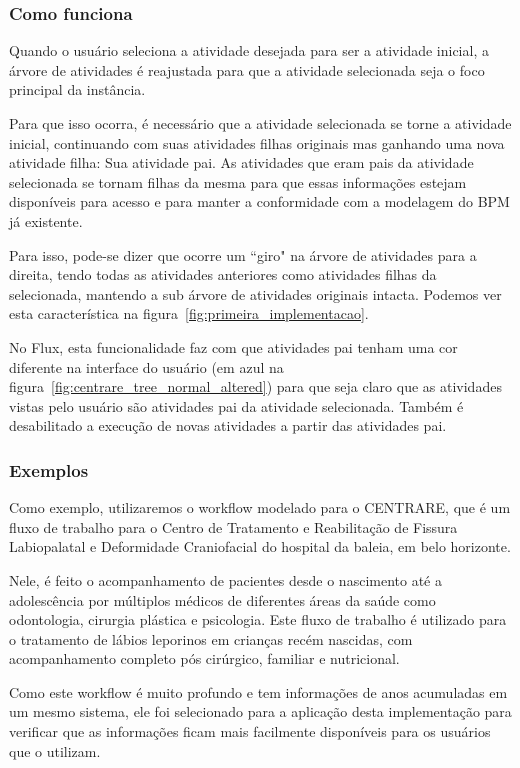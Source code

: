 \subsubsection{Como funciona}

Quando o usuário seleciona a atividade desejada para ser a atividade inicial, a árvore de atividades é reajustada para que a atividade selecionada seja o foco principal da instância.

Para que isso ocorra, é necessário que a atividade selecionada se torne a atividade inicial, continuando com suas atividades filhas originais mas ganhando uma nova atividade filha: Sua atividade pai. As atividades que eram pais da atividade selecionada se tornam filhas da mesma para que essas informações estejam disponíveis para acesso e para manter a conformidade com a modelagem do BPM já existente.

Para isso, pode-se dizer que ocorre um ``giro" na árvore de atividades para a direita, tendo todas as atividades anteriores como atividades filhas da selecionada, mantendo a sub árvore de atividades originais intacta. Podemos ver esta característica na figura~\ref{fig:primeira_implementacao}.

No Flux, esta funcionalidade faz com que atividades pai tenham uma cor diferente na interface do usuário (em azul na figura~\ref{fig:centrare_tree_normal_altered}) para que seja claro que as atividades vistas pelo usuário são atividades pai da atividade selecionada. Também é desabilitado a execução de novas atividades a partir das atividades pai.

\subsubsection{Exemplos}

Como exemplo, utilizaremos o workflow modelado para o CENTRARE, que é um fluxo de trabalho para o Centro de Tratamento e Reabilitação de Fissura Labiopalatal e Deformidade Craniofacial do hospital da baleia, em belo horizonte.

Nele, é feito o acompanhamento de pacientes desde o nascimento até a adolescência por múltiplos médicos de diferentes áreas da saúde como odontologia, cirurgia plástica e psicologia. Este fluxo de trabalho é utilizado para o tratamento de lábios leporinos em crianças recém nascidas, com acompanhamento completo pós cirúrgico, familiar e nutricional.

Como este workflow é muito profundo e tem informações de anos acumuladas em um mesmo sistema, ele foi selecionado para a aplicação desta implementação para verificar que as informações ficam mais facilmente disponíveis para os usuários que o utilizam.

